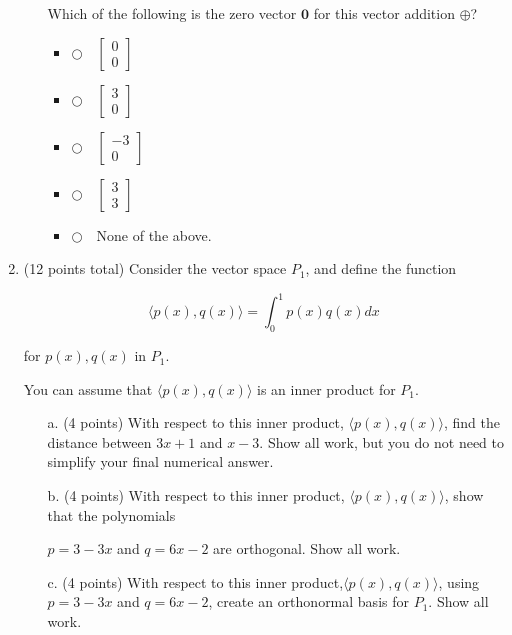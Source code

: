 \documentclass[12pt]{extarticle}
\newcommand{\chooseone}{{\Large$\Circle$\ \ }}
\begin{document}
\begin{enumerate}
\begin{enumerate}[label=\alph*.]
 Which of the following is the zero vector $\mathbf{0}$ for this vector addition $\oplus$?
\begin{itemize}[label={}]
\item \chooseone $\begin{bmatrix} 0\\0\end{bmatrix}$\medskip
\item \chooseone $\begin{bmatrix} 3\\0\end{bmatrix}$\medskip
\item \chooseone $\begin{bmatrix} -3\\0\end{bmatrix}$\medskip
\item \chooseone $\begin{bmatrix} 3\\3\end{bmatrix}$\medskip
\item \chooseone None of the above.
\end{itemize}

\end{enumerate}




\newpage


\item (12 points total) Consider the vector space $P_1$, and define the function

$$\langle p(x),q(x)\rangle=\int_0^1p(x)q(x) dx$$

for $p(x),q(x) $ in $P_1$.

You can assume that $\langle p(x),q(x)\rangle$ is an inner product for $P_1$.


\begin{itemize}
\item[a.] (4 points) With respect to this inner product, $\langle p(x),q(x)\rangle$, find the distance between $3x+1$ and $x-3$. Show all work, but you do not need to simplify your final numerical answer.

\vfill
\item[b.] (4 points) With respect to this inner product, $\langle p(x),q(x)\rangle$, show that the polynomials 

$p=3-3x$ and $q=6x-2$ are orthogonal. Show all work.


\vfill


\item[c.] (4 points) With respect to this inner product,$\langle p(x),q(x)\rangle$, using $p=3-3x$ and $q=6x-2$, create an orthonormal basis for $P_1$. Show all work.


\end{itemize}
\end{enumerate}
\end{document}
